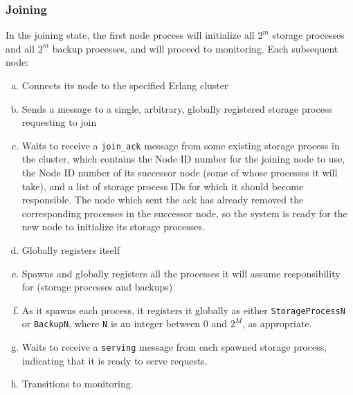 \documentclass[a4paper]{article}
\begin{document}
\subsubsection{Joining} 
In the joining state, the first node process will initialize all $2^m$ storage processes and all $2^m$ backup processes, and will proceed to monitoring. Each subsequent node:
\begin{enumerate}[a.]
\item Connects its node to the specified Erlang cluster
\item Sends a message to a single, arbitrary, globally registered storage process requesting to join 
\item Waits to receive a {\tt join\_ack} message from some existing storage process in the cluster, which contains the Node ID number for the joining node to use, the Node ID number of its successor node (some of whose processes it will take),    and a list of storage process IDs for which it should become responsible. The node which sent the ack has already removed the corresponding processes in the successor node, so the system is ready for the new node to initialize its storage processes.
\item Globally registers itself
\item Spawns and globally registers all the processes it will assume responsibility for (storage processes and backups)
\item As it spawns each process, it registers it globally as either {\tt StorageProcessN} or {\tt BackupN}, where {\tt N} is an integer between 0 and $2^M$, as appropriate.
\item Waits to receive a {\tt serving} message from each spawned storage process, indicating that it is ready to serve requests.
\item Transitions to monitoring.
\end{enumerate}
\end{document}
